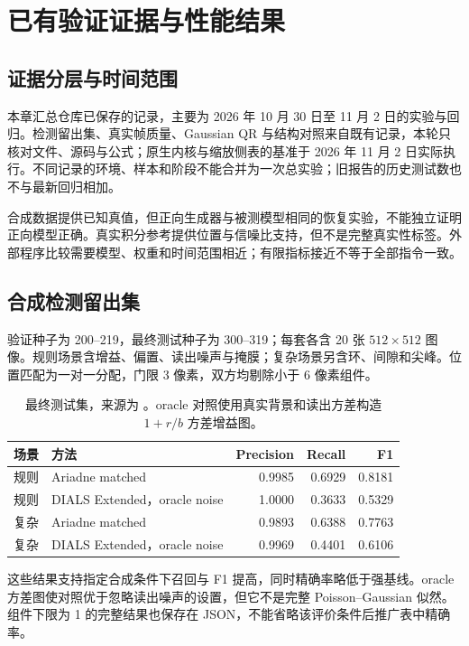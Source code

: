 \chapter{已有验证证据与性能结果}
\section{证据分层与时间范围}
本章汇总仓库已保存的记录，主要为 2026 年 10 月 30 日至 11 月 2 日的实验与回归。检测留出集、真实帧质量、Gaussian QR 与结构对照来自既有记录，本轮只核对文件、源码与公式；原生内核与缩放侧表的基准于 2026 年 11 月 2 日实际执行。不同记录的环境、样本和阶段不能合并为一次总实验；旧报告的历史测试数也不与最新回归相加。

合成数据提供已知真值，但正向生成器与被测模型相同的恢复实验，不能独立证明正向模型正确。真实积分参考提供位置与信噪比支持，但不是完整真实性标签。外部程序比较需要模型、权重和时间范围相近；有限指标接近不等于全部指令一致。
\section{合成检测留出集}
验证种子为 200--219，最终测试种子为 300--319；每套各含 20 张 $512\times512$ 图像。规则场景含增益、偏置、读出噪声与掩膜；复杂场景另含环、间隙和尖峰。位置匹配为一对一分配，门限 3 像素，双方均剔除小于 6 像素组件。
\begin{table}[htbp]\centering\small
\begin{tabular}{llrrr}
\toprule 场景 & 方法 & Precision & Recall & F1\\\midrule
规则 & Ariadne matched & 0.9985 & 0.6929 & 0.8181\\
规则 & DIALS Extended，oracle noise & 1.0000 & 0.3633 & 0.5329\\
复杂 & Ariadne matched & 0.9893 & 0.6388 & 0.7763\\
复杂 & DIALS Extended，oracle noise & 0.9969 & 0.4401 & 0.6106\\
\bottomrule
\end{tabular}
\caption{最终测试集，来源为 。oracle 对照使用真实背景和读出方差构造 $1+r/b$ 方差增益图。}
\end{table}
这些结果支持指定合成条件下召回与 F1 提高，同时精确率略低于强基线。oracle 方差图使对照优于忽略读出噪声的设置，但它不是完整 Poisson--Gaussian 似然。组件下限为 1 的完整结果也保存在 JSON，不能省略该评价条件后推广表中精确率。
